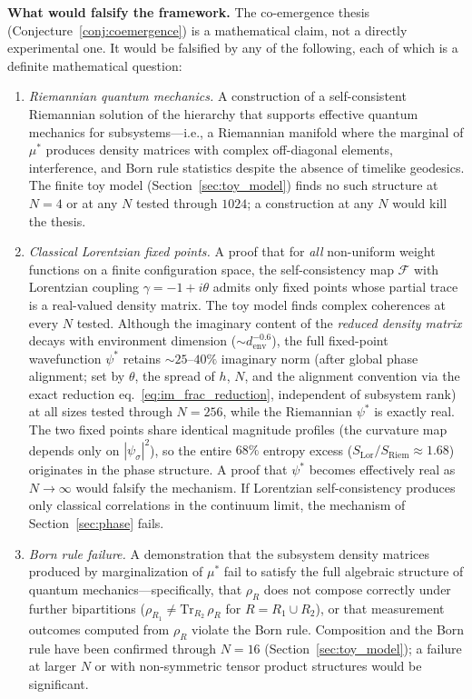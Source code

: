\documentclass[12pt,a4paper]{article}
\theoremstyle{definition}
\theoremstyle{remark}
\begin{document}
\noindent\textbf{What would falsify the framework.} The co-emergence
thesis (Conjecture~\ref{conj:coemergence}) is a mathematical claim, not
a directly experimental one. It would be falsified by any of the
following, each of which is a definite mathematical question:
\begin{enumerate}
\item \emph{Riemannian quantum mechanics.} A construction of a
self-consistent Riemannian solution of the hierarchy that supports
effective quantum mechanics for subsystems---i.e., a Riemannian manifold
where the marginal of $\mu^*$ produces density matrices with complex
off-diagonal elements, interference, and Born rule statistics despite
the absence of timelike geodesics. The finite toy model
(Section~\ref{sec:toy_model}) finds no such structure at $N = 4$ or at
any $N$ tested through $1024$; a construction at any $N$ would kill the
thesis.

\item \emph{Classical Lorentzian fixed points.} A proof that for
\emph{all} non-uniform weight functions on a finite configuration
space, the self-consistency map $\mathcal{F}$ with Lorentzian coupling
$\gamma = -1 + i\theta$ admits only fixed points whose partial trace
is a real-valued density matrix. The toy model finds complex coherences
at every $N$ tested. Although the imaginary content of the
\emph{reduced density matrix} decays with environment dimension
($\sim d_{\mathrm{env}}^{-0.6}$), the full fixed-point wavefunction
$\psi^*$ retains $\sim 25$--$40\%$ imaginary norm (after global phase
alignment; set by $\theta$, the spread of $h$, $N$, and the alignment
convention via the exact reduction eq.~\eqref{eq:im_frac_reduction},
independent of subsystem rank) at all sizes tested through
$N = 256$, while the Riemannian
$\psi^*$ is exactly real. The two fixed points share identical
magnitude profiles (the curvature map depends only on
$|\psi_\sigma|^2$), so the entire $68\%$ entropy excess
($S_{\mathrm{Lor}}/S_{\mathrm{Riem}} \approx 1.68$)
originates in the phase structure. A proof that $\psi^*$ becomes
effectively real as $N \to \infty$ would falsify the mechanism.
If Lorentzian self-consistency produces only classical correlations in
the continuum limit, the mechanism of Section~\ref{sec:phase} fails.

\item \emph{Born rule failure.} A demonstration that the subsystem
density matrices produced by marginalization of $\mu^*$ fail to satisfy
the full algebraic structure of quantum mechanics---specifically, that
$\rho_R$ does not compose correctly under further bipartitions
($\rho_{R_1} \neq \mathrm{Tr}_{R_2}\,\rho_R$ for $R = R_1 \cup R_2$),
or that measurement outcomes computed from $\rho_R$ violate the Born
rule. Composition and the Born rule have been confirmed through $N = 16$
(Section~\ref{sec:toy_model}); a failure at larger $N$ or with
non-symmetric tensor product structures would be significant.


\end{enumerate}
\end{document}
